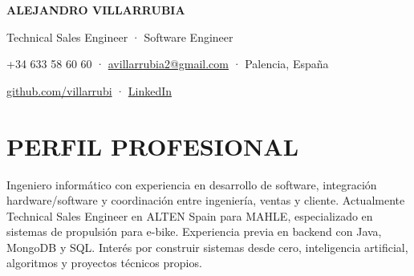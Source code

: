 \documentclass[10pt,a4paper]{article}
\begin{document}
{\fontsize{23}{26}\selectfont\bfseries\color{navy} ALEJANDRO VILLARRUBIA}\par
{\large Technical Sales Engineer · Software Engineer}\par
{\small\color{muted}+34 633 58 60 60 · \href{mailto:avillarrubia2@gmail.com}{avillarrubia2@gmail.com} · Palencia, España}\par
{\small\href{https://github.com/villarrubi}{github.com/villarrubi} · \href{https://www.linkedin.com/in/alejandro-villarrubia-garc\%C3\%ADa-3078892b9/}{LinkedIn}}\par
\section*{PERFIL PROFESIONAL}
Ingeniero informático con experiencia en desarrollo de software, integración hardware/software y coordinación entre ingeniería, ventas y cliente. Actualmente Technical Sales Engineer en ALTEN Spain para MAHLE, especializado en sistemas de propulsión para e-bike. Experiencia previa en backend con Java, MongoDB y SQL. Interés por construir sistemas desde cero, inteligencia artificial, algoritmos y proyectos técnicos propios.
\end{document}
